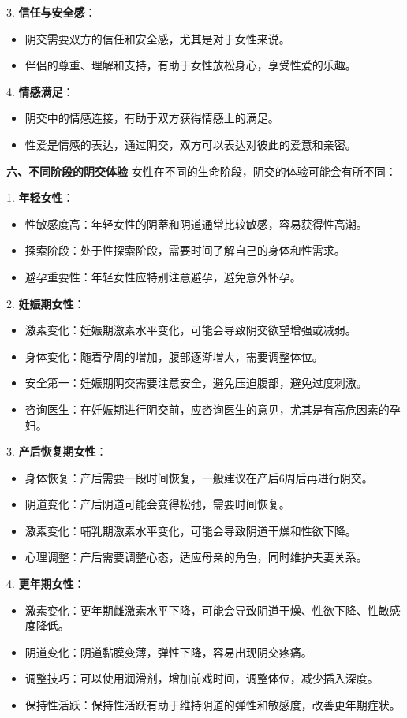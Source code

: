 \documentclass[12pt,UTF8]{ctexbook}
\begin{document}
3. \textbf{信任与安全感}：
\begin{itemize}
	\item 阴交需要双方的信任和安全感，尤其是对于女性来说。
	\item 伴侣的尊重、理解和支持，有助于女性放松身心，享受性爱的乐趣。
\end{itemize}

4. \textbf{情感满足}：
\begin{itemize}
	\item 阴交中的情感连接，有助于双方获得情感上的满足。
	\item 性爱是情感的表达，通过阴交，双方可以表达对彼此的爱意和亲密。
\end{itemize}

\textbf{六、不同阶段的阴交体验}
女性在不同的生命阶段，阴交的体验可能会有所不同：

1. \textbf{年轻女性}：
\begin{itemize}
	\item 性敏感度高：年轻女性的阴蒂和阴道通常比较敏感，容易获得性高潮。
	\item 探索阶段：处于性探索阶段，需要时间了解自己的身体和性需求。
	\item 避孕重要性：年轻女性应特别注意避孕，避免意外怀孕。
\end{itemize}

2. \textbf{妊娠期女性}：
\begin{itemize}
	\item 激素变化：妊娠期激素水平变化，可能会导致阴交欲望增强或减弱。
	\item 身体变化：随着孕周的增加，腹部逐渐增大，需要调整体位。
	\item 安全第一：妊娠期阴交需要注意安全，避免压迫腹部，避免过度刺激。
	\item 咨询医生：在妊娠期进行阴交前，应咨询医生的意见，尤其是有高危因素的孕妇。
\end{itemize}

3. \textbf{产后恢复期女性}：
\begin{itemize}
	\item 身体恢复：产后需要一段时间恢复，一般建议在产后6周后再进行阴交。
	\item 阴道变化：产后阴道可能会变得松弛，需要时间恢复。
	\item 激素变化：哺乳期激素水平变化，可能会导致阴道干燥和性欲下降。
	\item 心理调整：产后需要调整心态，适应母亲的角色，同时维护夫妻关系。
\end{itemize}

4. \textbf{更年期女性}：
\begin{itemize}
	\item 激素变化：更年期雌激素水平下降，可能会导致阴道干燥、性欲下降、性敏感度降低。
	\item 阴道变化：阴道黏膜变薄，弹性下降，容易出现阴交疼痛。
	\item 调整技巧：可以使用润滑剂，增加前戏时间，调整体位，减少插入深度。
	\item 保持性活跃：保持性活跃有助于维持阴道的弹性和敏感度，改善更年期症状。
\end{itemize}
\end{document}
